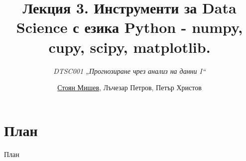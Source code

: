 \documentclass{beamer}
\title{Лекция 3. Инструменти за Data Science с езика Python - numpy, cupy, scipy, matplotlib. }
\subtitle{\textit{DTSC001 „Прогнозиране чрез анализ на данни I“}}
\author{\newline \newline \underline{Стоян Мишев}, Лъчезар Петров, Петър Христов}
\institute{\url{https://facebook.com/nbudatascience}}
\date{} %
\begin{document}
{ 
\frame{\titlepage}}

\section*{План}\begin{frame}{План}\tableofcontents\end{frame}


%    


    


\end{document}
